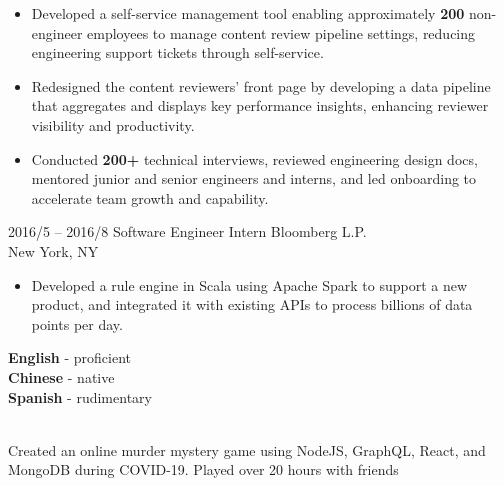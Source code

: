 \documentclass[9pt]{developercv} %
\begin{document}
\begin{entrylist}
{\begin{itemize}[leftmargin=-0.0125in]
				\item Developed a self-service management tool enabling approximately \textbf{200} non-engineer employees to manage content review pipeline settings, reducing engineering support tickets through self-service.
				\item Redesigned the content reviewers’ front page by developing a data pipeline that aggregates and displays key performance insights, enhancing reviewer visibility and productivity.
				\item Conducted \textbf{200+} technical interviews, reviewed engineering design docs, mentored junior and senior engineers and interns, and led onboarding to accelerate team growth and capability.
			\end{itemize}
		}
	\entry
		{2016/5 -- 2016/8}
		{Software Engineer Intern}
		{Bloomberg L.P. \\\footnotesize{New York, NY}}
		{
			\begin{itemize}[leftmargin=-0.0125in]
		\item Developed a rule engine in Scala using Apache Spark to support a new product, and integrated it with existing APIs to process billions of data points per day.
	 	\end{itemize}
		}
\end{entrylist}


\begin{minipage}[t]{0.4\textwidth} %
	\vspace{-\baselineskip} %

	\begin{barchart}{4}
	\end{barchart}
\end{minipage}
\hfill
\begin{minipage}[t]{0.3\textwidth}
	\vspace{-\baselineskip} %
	
	
	\textbf{English} - proficient\\
	\textbf{Chinese} - native\\
	\textbf{Spanish} - rudimentary

	\\
	Created an online murder mystery game using NodeJS, GraphQL, React, and MongoDB during COVID-19. Played over 20 hours with friends
\end{minipage}
\hfill
\end{document}
